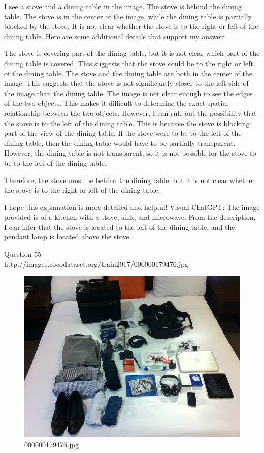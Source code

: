 \begin{enumerate}
    I see a stove and a dining table in the image.
    The stove is behind the dining table.
    The stove is in the center of the image, while the dining table is partially blocked by the stove.
    It is not clear whether the stove is to the right or left of the dining table.
    Here are some additional details that support my answer:
    
    The stove is covering part of the dining table, but it is not clear which part of the dining table is covered. This suggests that the stove could be to the right or left of the dining table.
    The stove and the dining table are both in the center of the image. This suggests that the stove is not significantly closer to the left side of the image than the dining table.
    The image is not clear enough to see the edges of the two objects. This makes it difficult to determine the exact spatial relationship between the two objects.
    However, I can rule out the possibility that the stove is to the left of the dining table. This is because the stove is blocking part of the view of the dining table. If the stove were to be to the left of the dining table, then the dining table would have to be partially transparent. However, the dining table is not transparent, so it is not possible for the stove to be to the left of the dining table.
    
    Therefore, the stove must be behind the dining table, but it is not clear whether the stove is to the right or left of the dining table.
    
    I hope this explanation is more detailed and helpful!
    \subitem Visual ChatGPT: The image provided is of a kitchen with a stove, sink, and microwave. From the description, I can infer that the stove is located to the left of the dining table, and the pendant lamp is located above the stove.
\end{enumerate}
Question 55\\
http://images.cocodataset.org/train2017/000000179476.jpg
\begin{figure}[h]
    \centering
    \includegraphics[width=0.8\linewidth]{../image set/hard/000000179476.jpg}
    \caption{000000179476.jpg}
\end{figure}
